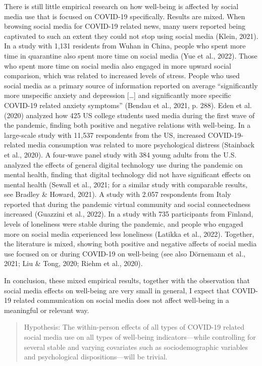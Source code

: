 \documentclass[
  man,mask,floatsintext]{apa7}
\begin{document}
There is still little empirical research on how well-being is affected by social media use that is focused on COVID-19 specifically.
Results are mixed.
When browsing social media for COVID-19 related news, many users reported being captivated to such an extent they could not stop using social media (Klein, 2021).
In a study with 1,131 residents from Wuhan in China, people who spent more time in quarantine also spent more time on social media (Yue et al., 2022).
Those who spent more time on social media also engaged in more upward social comparison, which was related to increased levels of stress.
People who used social media as a primary source of information reported on average ``significantly more unspecific anxiety and depression {[}\ldots{]} and significantly more specific COVID-19 related anxiety symptoms'' (Bendau et al., 2021, p. 288).
Eden et al. (2020) analyzed how 425 US college students used media during the first wave of the pandemic, finding both positive and negative relations with well-being.
In a large-scale study with 11,537 respondents from the US, increased COVID-19-related media consumption was related to more psychological distress (Stainback et al., 2020).
A four-wave panel study with 384 young adults from the U.S. analyzed the effects of general digital technology use during the pandemic on mental health, finding that digital technology did not have significant effects on mental health (Sewall et al., 2021; for a similar study with comparable results, see Bradley \& Howard, 2021).
A study with 2.057 respondents from Italy reported that during the pandemic virtual community and social connectedness increased (Guazzini et al., 2022).
In a study with 735 participants from Finland, levels of loneliness were stable during the pandemic, and people who engaged more on social media experienced less loneliness (Latikka et al., 2022).
Together, the literature is mixed, showing both positive and negative affects of social media use focused on or during COVID-19 on well-being (see also Dörnemann et al., 2021; Liu \& Tong, 2020; Riehm et al., 2020).

In conclusion, these mixed empirical results, together with the observation that social media effects on well-being are very small in general, I expect that COVID-19 related communication on social media does not affect well-being in a meaningful or relevant way.

\begin{quote}
Hypothesis: The within-person effects of all types of COVID-19 related social media use on all types of well-being indicators---while controlling for several stable and varying covariates such as sociodemographic variables and psychological dispositions---will be trivial.
\end{quote}
\end{document}
